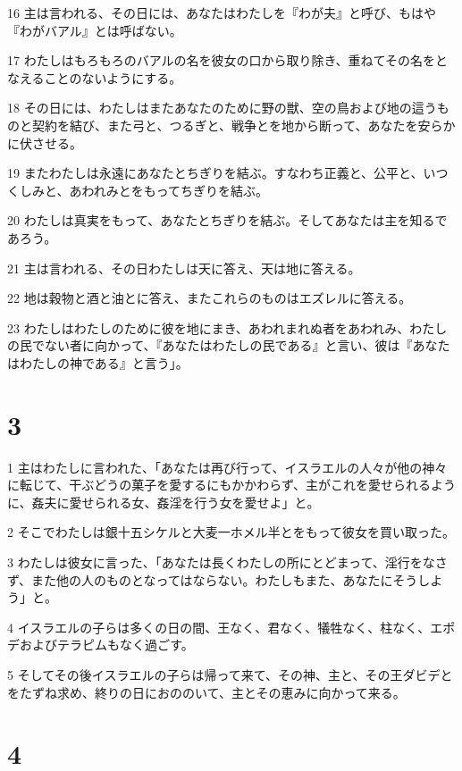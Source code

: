 \par 16 主は言われる、その日には、あなたはわたしを『わが夫』と呼び、もはや『わがバアル』とは呼ばない。
\par 17 わたしはもろもろのバアルの名を彼女の口から取り除き、重ねてその名をとなえることのないようにする。
\par 18 その日には、わたしはまたあなたのために野の獣、空の鳥および地の這うものと契約を結び、また弓と、つるぎと、戦争とを地から断って、あなたを安らかに伏させる。
\par 19 またわたしは永遠にあなたとちぎりを結ぶ。すなわち正義と、公平と、いつくしみと、あわれみとをもってちぎりを結ぶ。
\par 20 わたしは真実をもって、あなたとちぎりを結ぶ。そしてあなたは主を知るであろう。
\par 21 主は言われる、その日わたしは天に答え、天は地に答える。
\par 22 地は穀物と酒と油とに答え、またこれらのものはエズレルに答える。
\par 23 わたしはわたしのために彼を地にまき、あわれまれぬ者をあわれみ、わたしの民でない者に向かって、『あなたはわたしの民である』と言い、彼は『あなたはわたしの神である』と言う」。

\chapter{3}

\par 1 主はわたしに言われた、「あなたは再び行って、イスラエルの人々が他の神々に転じて、干ぶどうの菓子を愛するにもかかわらず、主がこれを愛せられるように、姦夫に愛せられる女、姦淫を行う女を愛せよ」と。
\par 2 そこでわたしは銀十五シケルと大麦一ホメル半とをもって彼女を買い取った。
\par 3 わたしは彼女に言った、「あなたは長くわたしの所にとどまって、淫行をなさず、また他の人のものとなってはならない。わたしもまた、あなたにそうしよう」と。
\par 4 イスラエルの子らは多くの日の間、王なく、君なく、犠牲なく、柱なく、エポデおよびテラピムもなく過ごす。
\par 5 そしてその後イスラエルの子らは帰って来て、その神、主と、その王ダビデとをたずね求め、終りの日におののいて、主とその恵みに向かって来る。

\chapter{4}

